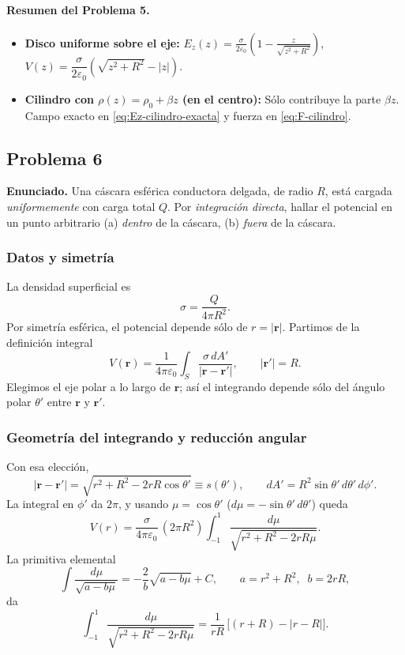 \documentclass{article}
\begin{document}
\paragraph{Resumen del Problema 5.}
\begin{itemize}
\item \textbf{Disco uniforme sobre el eje:} $\displaystyle E_z(z)=\frac{\sigma}{2\varepsilon_0}\left(1-\frac{z}{\sqrt{z^2+R^2}}\right)$, \ 
$V(z)=\dfrac{\sigma}{2\varepsilon_0}\left(\sqrt{z^2+R^2}-|z|\right)$.
\item \textbf{Cilindro con $\rho(z)=\rho_0+\beta z$ (en el centro):} Sólo contribuye la parte $\beta z$.  
Campo exacto en \eqref{eq:Ez-cilindro-exacta} y fuerza en \eqref{eq:F-cilindro}.
\end{itemize}

\subsection{Problema 6} \vspace{0.5cm}

\textbf{Enunciado.} Una cáscara esférica conductora delgada, de radio $R$, está cargada \emph{uniformemente} con carga total $Q$. Por \emph{integración directa}, hallar el potencial en un punto arbitrario (a) \emph{dentro} de la cáscara, (b) \emph{fuera} de la cáscara.

\subsubsection*{Datos y simetría}
La densidad superficial es
\[
\sigma=\frac{Q}{4\pi R^2}.
\]
Por simetría esférica, el potencial depende sólo de $r=|\mathbf r|$. Partimos de la definición integral
\[
V(\mathbf r)=\frac{1}{4\pi\varepsilon_0}\int_{S}\frac{\sigma\,dA'}{|\mathbf r-\mathbf r'|},
\qquad |\mathbf r'|=R.
\]
Elegimos el eje polar a lo largo de $\mathbf r$; así el integrando depende sólo del ángulo polar $\theta'$ entre $\mathbf r$ y $\mathbf r'$.

\subsubsection*{Geometría del integrando y reducción angular}
Con esa elección,
\[
|\mathbf r-\mathbf r'|=\sqrt{r^2+R^2-2rR\cos\theta'}\equiv s(\theta'),\qquad
dA'=R^2\sin\theta'\,d\theta'\,d\phi'.
\]
La integral en $\phi'$ da $2\pi$, y usando $\mu=\cos\theta'$ ($d\mu=-\sin\theta'\,d\theta'$) queda
\[
V(r)=\frac{\sigma}{4\pi\varepsilon_0}\,(2\pi R^2)\int_{-1}^{1}\frac{d\mu}{\sqrt{r^2+R^2-2rR\mu}}.
\]
La primitiva elemental
\[
\int\frac{d\mu}{\sqrt{a-b\mu}}=-\frac{2}{b}\sqrt{a-b\mu}+C,\qquad a=r^2+R^2,\;\;b=2rR,
\]
da
\[
\int_{-1}^{1}\frac{d\mu}{\sqrt{r^2+R^2-2rR\mu}}
=\frac{1}{rR}\,\Big[(r+R)-|r-R|\Big].
\]
\end{document}
